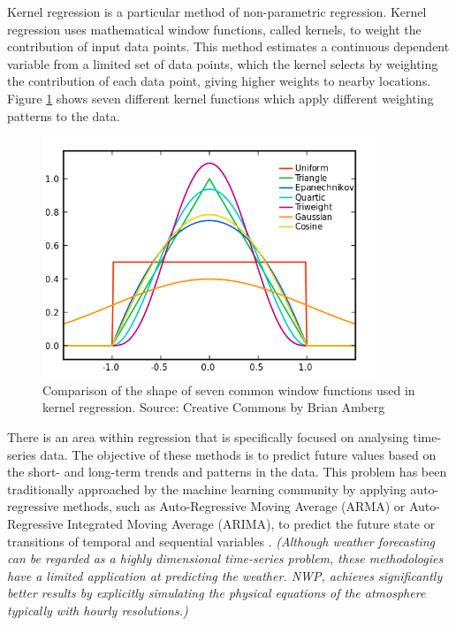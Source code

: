 \medskip

Kernel regression is a particular method of non-parametric regression. Kernel regression uses mathematical window functions, called kernels, to weight the contribution of input data points. This method estimates a continuous dependent variable from a limited set of data points, which the kernel selects by weighting the contribution of each data point, giving higher weights to nearby locations. Figure \ref{kernel_shapes} shows seven different kernel functions which apply different weighting patterns to the data.

\medskip

\begin{figure}[h]
 \centerline{\includegraphics[width=10cm]{kernel_shapes.png}} \caption{Comparison of the shape of seven common window functions used in kernel regression. Source: Creative Commons by Brian Amberg}\label{kernel_shapes}
\end{figure}

\bigskip
\bigskip


\bigskip
\bigskip

There is an area within regression that is specifically focused on analysing time-series data. The objective of these methods is to predict future values based on the short- and long-term trends and patterns in the data. This problem has been traditionally approached by the machine learning community by applying auto-regressive methods, such as Auto-Regressive Moving Average (ARMA) or Auto-Regressive Integrated Moving Average (ARIMA), to predict the future state or transitions of temporal and sequential variables \citep{stram1986temporal,zhang2003time}. \textit{(Although weather forecasting can be regarded as a highly dimensional time-series problem, these methodologies have a limited application at predicting the weather. NWP, achieves significantly better results by explicitly simulating the physical equations of the atmosphere typically with hourly resolutions.)}

